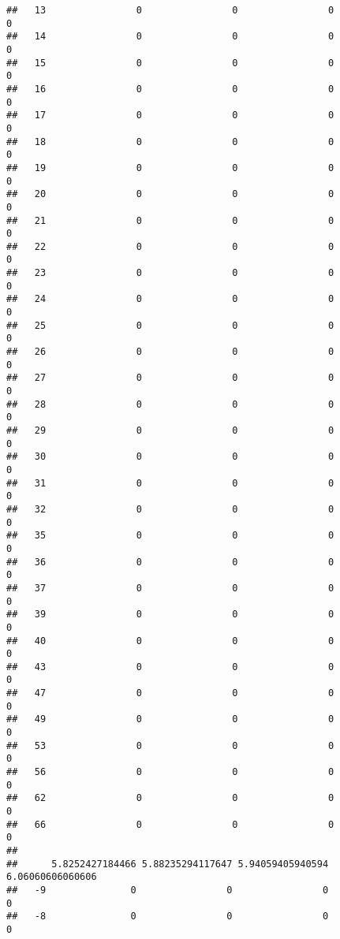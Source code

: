 \documentclass[]{article}
\begin{document}
\begin{verbatim}
##   13                0                0                0                0
##   14                0                0                0                0
##   15                0                0                0                0
##   16                0                0                0                0
##   17                0                0                0                0
##   18                0                0                0                0
##   19                0                0                0                0
##   20                0                0                0                0
##   21                0                0                0                0
##   22                0                0                0                0
##   23                0                0                0                0
##   24                0                0                0                0
##   25                0                0                0                0
##   26                0                0                0                0
##   27                0                0                0                0
##   28                0                0                0                0
##   29                0                0                0                0
##   30                0                0                0                0
##   31                0                0                0                0
##   32                0                0                0                0
##   35                0                0                0                0
##   36                0                0                0                0
##   37                0                0                0                0
##   39                0                0                0                0
##   40                0                0                0                0
##   43                0                0                0                0
##   47                0                0                0                0
##   49                0                0                0                0
##   53                0                0                0                0
##   56                0                0                0                0
##   62                0                0                0                0
##   66                0                0                0                0
##     
##      5.8252427184466 5.88235294117647 5.94059405940594 6.06060606060606
##   -9               0                0                0                0
##   -8               0                0                0                0

\end{verbatim}
\end{document}
